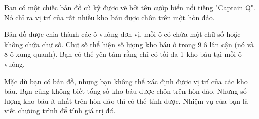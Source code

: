 Bạn có một chiếc bản đồ cũ kỹ được vẽ bởi tên cướp biển nổi tiếng "Captain Q". Nó chỉ ra vị trí của rất nhiều kho báu được chôn trên một hòn đảo.

Bản đồ được chia thành các ô vuông đơn vị, mỗi ô có chứa một chữ số hoặc không chứa chữ số. Chữ số thể hiện số lượng kho báu ở trong 9 ô lân cận (nó và 8 ô xung quanh). Bạn có thể yên tâm rằng chỉ có tối đa 1 kho báu tại mỗi ô vuông.

Mặc dù bạn có bản đồ, nhưng bạn không thể xác định được vị trí của các kho báu. Bạn cũng không biết tổng số kho báu được chôn trên hòn đảo. Nhưng số lượng kho báu ít nhất trên hòn đảo thì có thể tính được. Nhiệm vụ của bạn là viết chương trình để tính giá trị đó.

\